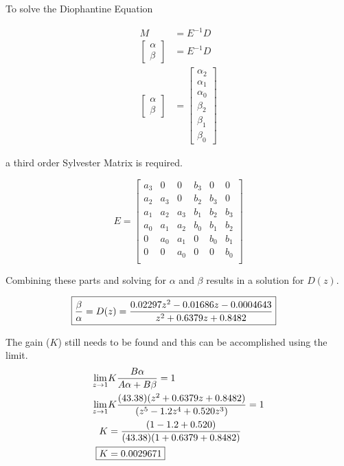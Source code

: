 \documentclass{article}
\begin{document}
To solve the Diophantine Equation

\begin{align*}
	M &= E^{-1} D \\
	\left[
	\begin{array}{l}
		\alpha \\
		\beta
	\end{array}
	\right] &= E^{-1} D \\
	\left[
	\begin{array}{l}
		\alpha \\
		\beta
	\end{array}
	\right] &= 
	\left[
	\begin{array}{l}
		\alpha_2 \\
		\alpha_1 \\
		\alpha_0 \\
		\beta_2 \\
		\beta_1 \\
		\beta_0
	\end{array}
	\right]
\end{align*}

a third order Sylvester Matrix is required.

\[
E=
\begin{bmatrix}
	a_3 & 0 & 0 & b_3 & 0 & 0 \\
	a_2 & a_3 & 0 & b_2 & b_3 & 0 \\
	a_1 & a_2 & a_3 & b_1 & b_2 & b_3 \\
	a_0 & a_1 & a_2 & b_0 & b_1 & b_2 \\
	0 & a_0 & a_1 & 0 & b_0 & b_1 \\
	0 & 0 & a_0 & 0 & 0 & b_0 \\
\end{bmatrix}
\]

Combining these parts and solving for $\alpha$ and $\beta$ results
in a solution for $D(z)$.

\begin{align*}
	\Aboxed{
	\frac{\beta}{\alpha} &= D(z) = \frac{0.02297 z^2 - 0.01686 z - 0.0004643}
								{z^2 + 0.6379 z + 0.8482}
	}
\end{align*}

\begin{samepage}
The gain ($K$) still needs to be found and this can be accomplished
using the limit.
\begin{align*}
\lim_{z \to 1} &K \frac{B \alpha}{A \alpha + B \beta} = 1\\
\lim_{z \to 1} &K \frac{(43.38) (z^2 + 0.6379 z + 0.8482)}
	{(z^5 - 1.2z^4 + 0.520z^3)} = 1 \\
K &= \frac{(1 - 1.2 + 0.520)}{(43.38)(1 + 0.6379 + 0.8482)} \\
\Aboxed{ K &= 0.0029671 }
\end{align*}
\end{samepage}
\end{document}
